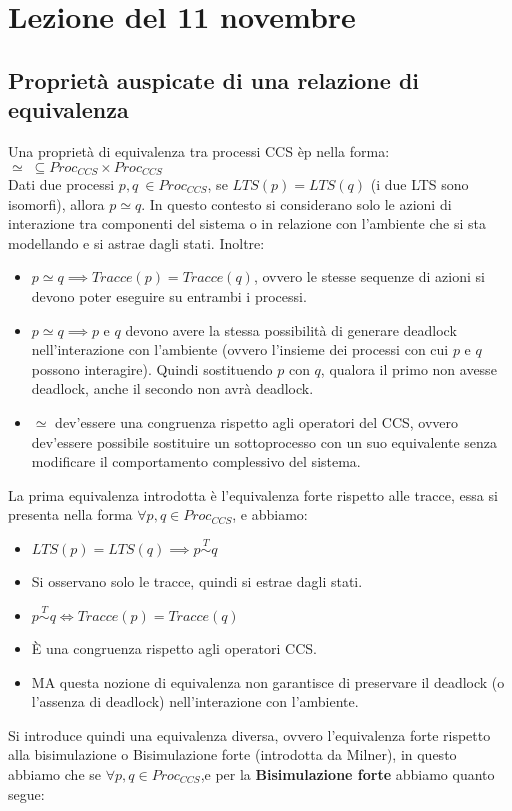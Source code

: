 \section{Lezione del 11 novembre}
\subsection{Proprietà auspicate di una relazione di equivalenza}
Una proprietà di equivalenza tra processi CCS èp nella forma: $\simeq \;\subseteq  Proc_{CCS} \times  Proc_{CCS}$\\
Dati due processi $p,q\ \in Proc_{CCS}$, se $LTS(p)=LTS(q)$ (i due LTS sono isomorfi), allora $ p\simeq q$. In questo contesto si considerano solo le azioni di interazione tra componenti del sistema o in relazione con l’ambiente che si sta modellando e si astrae dagli stati.
Inoltre: 
\begin{itemize}
    \item $p\simeq q\implies Tracce(p)=Tracce(q)$, ovvero le stesse sequenze di azioni si devono poter eseguire su entrambi i processi. 
    \item $p\simeq q \implies p$ e $q$ devono avere la stessa possibilità di generare deadlock nell’interazione con l’ambiente (ovvero l’insieme dei processi con cui $p$ e $q$ possono interagire). Quindi sostituendo $p$ con $q$, qualora il primo non avesse deadlock, anche il secondo non avrà deadlock.
    \item $\simeq$ dev’essere una congruenza rispetto agli operatori del CCS, ovvero dev’essere possibile sostituire un sottoprocesso con un suo equivalente senza modificare il comportamento complessivo del sistema. 
\end{itemize}
La prima equivalenza introdotta è l'equivalenza forte rispetto alle tracce, essa si presenta nella forma $\forall p,q\in Proc_{CCS}$, e abbiamo:
\begin{itemize}
    \item $LTS(p)=LTS(q)\implies p\stackrel{T}\sim q$
    \item Si osservano solo le tracce, quindi si estrae dagli stati.
    \item $p\stackrel{T}{\sim} q \iff Tracce(p)=Tracce(q)$
    \item È una congruenza rispetto agli operatori CCS.
    \item MA questa nozione di equivalenza non garantisce di preservare il deadlock (o l’assenza di deadlock) nell’interazione con l’ambiente.
\end{itemize}
Si introduce quindi una equivalenza diversa, ovvero l'equivalenza forte rispetto alla bisimulazione o Bisimulazione forte (introdotta da Milner), in questo abbiamo che se $\forall p,q \in Proc_{CCS}$,e per la \textbf{Bisimulazione forte} abbiamo quanto segue:

